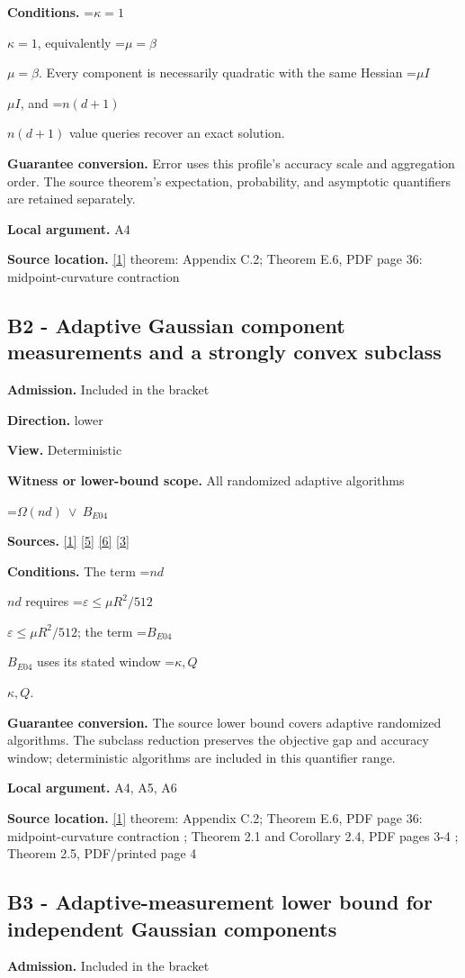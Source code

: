 \documentclass[10pt,a4paper]{article}
\newcommand{\AtlasMath}[1]{\par\begingroup\centering\setbox0=\hbox{$\displaystyle #1$}\ifdim\wd0>1.4\linewidth\typeout{ATLAS WIDE FORMULA: \the\wd0}\fi\ifdim\wd0>\linewidth\resizebox{\linewidth}{!}{\box0}\else\box0\fi\par\endgroup}
\newcommand{\AtlasInlineMath}[1]{\begingroup\setbox0=\hbox{$#1$}\ifdim\wd0>.4\linewidth\endgroup\AtlasMath{#1}\else\endgroup$#1$\fi}
\begin{document}
\textbf{Conditions.} \AtlasInlineMath{\kappa=1}, equivalently \AtlasInlineMath{\mu=\beta}. Every component is necessarily quadratic with the same Hessian \AtlasInlineMath{\mu I}, and \AtlasInlineMath{n(d+1)} value queries recover an exact solution.

\textbf{Guarantee conversion.} Error uses this profile's accuracy scale and aggregation order. The source theorem's expectation, probability, and asymptotic quantifiers are retained separately.

\textbf{Local argument.} A4

\textbf{Source location.} \href{https://arxiv.org/html/2610.00345v1}{[1]} theorem: Appendix C.2; Theorem E.6, PDF page 36: midpoint-curvature contraction

\subsection{B2 - Adaptive Gaussian component measurements and a strongly convex subclass}
\textbf{Admission.} Included in the bracket

\textbf{Direction.} lower

\textbf{View.} Deterministic

\textbf{Witness or lower-bound scope.} All randomized adaptive algorithms

\AtlasMath{\Omega(nd)\ \vee\ B_{E04}}
\textbf{Sources.} \href{https://arxiv.org/html/2610.00345v1}{[1]} \href{https://arxiv.org/html/2607.16558v2}{[5]} \href{https://www.mathnet.ru/php/archive.phtml?jrnid=mzm&option_lang=eng&paperid=1697&wshow=paper}{[6]} \href{https://arxiv.org/abs/2109.08858}{[3]}

\textbf{Conditions.} The term \AtlasInlineMath{nd} requires \AtlasInlineMath{\varepsilon\le\mu R^2/512}; the term \AtlasInlineMath{B_{E04}} uses its stated window \AtlasInlineMath{\kappa,Q}.

\textbf{Guarantee conversion.} The source lower bound covers adaptive randomized algorithms. The subclass reduction preserves the objective gap and accuracy window; deterministic algorithms are included in this quantifier range.

\textbf{Local argument.} A4, A5, A6

\textbf{Source location.} \href{https://arxiv.org/html/2610.00345v1}{[1]} theorem: Appendix C.2; Theorem E.6, PDF page 36: midpoint-curvature contraction ; Theorem 2.1 and Corollary 2.4, PDF pages 3-4 ; Theorem 2.5, PDF/printed page 4

\subsection{B3 - Adaptive-measurement lower bound for independent Gaussian components}
\textbf{Admission.} Included in the bracket
\end{document}
